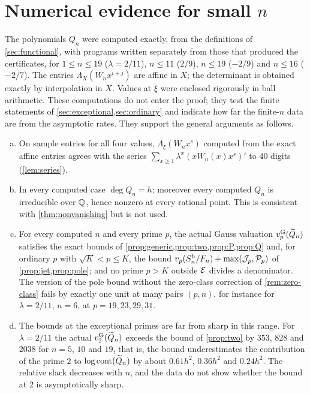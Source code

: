 \section{Numerical evidence for small \texorpdfstring{$n$}{n}}\label{app:numerics}

The polynomials $Q_n$ were computed exactly, from the definitions of \cref{sec:functional}, with programs written separately from those that produced the certificates, for $1\le n\le19$ ($\lambda=2/11$), $n\le11$ ($2/9$), $n\le19$ ($-2/9$) and $n\le16$ ($-2/7$). The entries $\Lambda_X(W_nx^{i+j})$ are affine in $X$; the determinant is obtained exactly by interpolation in $X$. Values at $\xi$ were enclosed rigorously in ball arithmetic. These computations do not enter the proof; they test the finite statements of \cref{sec:exceptional,sec:ordinary} and indicate how far the finite-$n$ data are from the asymptotic rates. They support the general arguments as follows.

\begin{enumerate}[(a)]
\item On sample entries for all four values, $\Lambda_\xi(W_nx^s)$ computed from the exact affine entries agrees with the series $\sum_{x\ge1}\lambda^x(xW_n(x)x^s)'$ to $40$ digits (\cref{lem:series}).
\item In every computed case $\deg Q_n=h$; moreover every computed $Q_n$ is irreducible over $\mathbb{Q}$, hence nonzero at every rational point. This is consistent with \cref{thm:nonvanishing} but is not used.
\item For every computed $n$ and every prime $p$, the actual Gauss valuation $v^{\mathrm{G}}_{p}(\widetilde{Q}_n)$ satisfies the exact bounds of \cref{prop:generic,prop:two,prop:P,prop:Q} and, for ordinary $p$ with $\sqrt K<p\le K$, the bound $v_p(S_n^h/F_n)+\max(\mathcal{J}_p,\mathcal{P}_p)$ of \cref{prop:jet,prop:pole}; and no prime $p>K$ outside $\mathcal{E}$ divides a denominator. The version of the pole bound without the zero-class correction of \cref{rem:zero-class} fails by exactly one unit at many pairs $(p,n)$, for instance for $\lambda=2/11$, $n=6$, at $p=19,23,29,31$.
\item The bounds at the exceptional primes are far from sharp in this range. For $\lambda=2/11$ the actual $v^{\mathrm{G}}_{2}(\widetilde{Q}_n)$ exceeds the bound of \cref{prop:two} by $353$, $828$ and $2038$ for $n=5$, $10$ and $19$, that is, the bound underestimates the contribution of the prime $2$ to $\log\operatorname{cont}(\widetilde{Q}_n)$ by about $0.61h^2$, $0.36h^2$ and $0.24h^2$. The relative slack decreases with $n$, and the data do not show whether the bound at $2$ is asymptotically sharp.
\end{enumerate}

